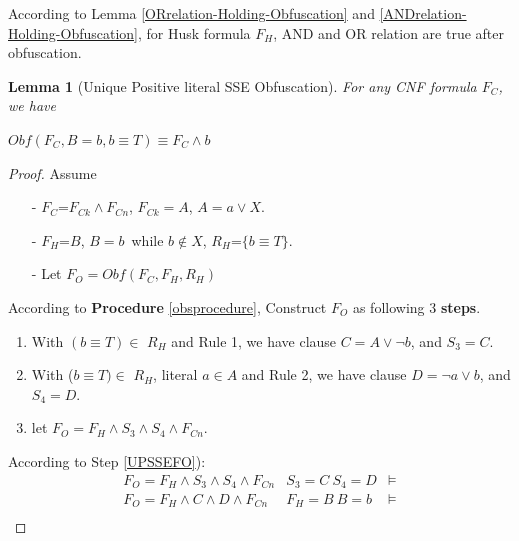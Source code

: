 \documentclass[conference,compsocconf]{IEEEtran}
\newtheorem{lemma}{\textbf{Lemma}}
\begin{document}
According to Lemma \ref{ORrelation-Holding-Obfuscation} and \ref{ANDrelation-Holding-Obfuscation},
for Husk formula $F_H$,  AND and OR relation are true after obfuscation.

\begin{lemma}[Unique Positive literal SSE Obfuscation]\label{UPSSE-lemma}
For any CNF formula $F_C$, we have

\textbf{$Obf(F_C,B=b,{b\equiv T})\equiv F_C\wedge b$}
\end{lemma}
\begin{proof}
Assume
\begin{enumerate}
 \item[-]$F_C$=$F_{Ck} \wedge F_{Cn}$, $F_{Ck}=A$, $A=a\vee X$.  
 \item[-]$F_H$=$B$, $B=b$~while $b\notin X$, $R_H$=$\{b\equiv T\}$.
 \item[-]Let $F_O=Obf(F_C,F_H,R_H)$
 \end{enumerate}
According to \textbf{Procedure} \ref{obsprocedure}, Construct $F_O$ as following 3 \textbf{steps}.
\begin{enumerate}
\item With $(b\equiv T) \in $ $R_H$ and Rule 1, 
we have clause $C=A\vee \neg b$, and $S_3=C$.
\item
With ($b\equiv T) \in $ $R_H$, literal $a\in A$ and Rule 2, 
we have clause $D=\neg a\vee b$,
and $S_4=D$.
\item \label{UPSSEFO}
let $F_O=F_H \wedge S_3\wedge S_4 \wedge F_{Cn}$.
\end{enumerate}
According to Step \ref{UPSSEFO}):
\begin{equation}
\begin{array}{ccc}
F_O  =  F_H \wedge S_3\wedge S_4\wedge F_{Cn}           &S_3=C~ S_4=D              &\models\\
F_O  =  F_H\wedge C\wedge D\wedge F_{Cn}                &F_H=B~ B=b                &\models\\

\end{array}
\end{equation}
\end{proof}
\end{document}
